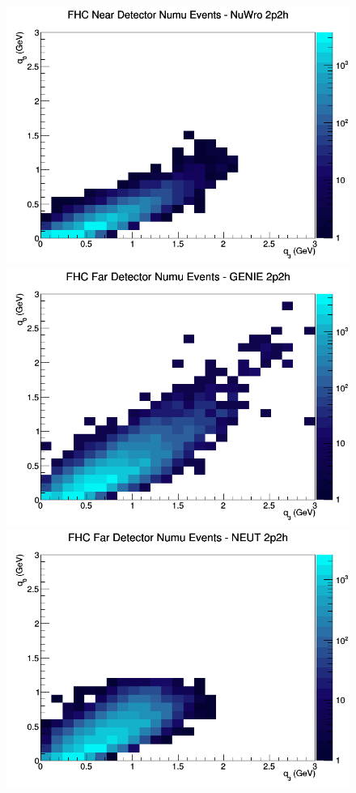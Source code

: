 \documentclass[12pt]{article}
\begin{document}
\begin{figure}[h]
\includegraphics[width=\linewidth]{eff_q0_q3/GAr/2p2h_FHC_ND_numu_q3_q0_NuWro.png}
\endminipage
\newline
{}
\includegraphics[width=\linewidth]{eff_q0_q3/GAr/2p2h_FHC_FD_numu_q3_q0_GENIE.png}
\endminipage
{}
\includegraphics[width=\linewidth]{eff_q0_q3/GAr/2p2h_FHC_FD_numu_q3_q0_NEUT.png}

\end{figure}
\end{document}
